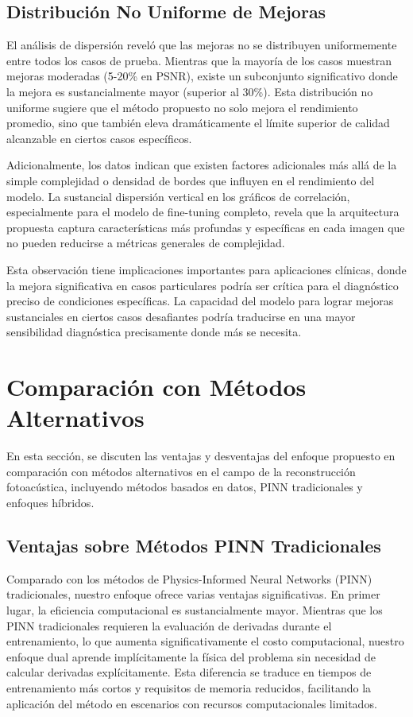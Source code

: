 \subsection{Distribución No Uniforme de Mejoras}

El análisis de dispersión reveló que las mejoras no se distribuyen uniformemente entre todos los casos de prueba. Mientras que la mayoría de los casos muestran mejoras moderadas (5-20\% en PSNR), existe un subconjunto significativo donde la mejora es sustancialmente mayor (superior al 30\%). Esta distribución no uniforme sugiere que el método propuesto no solo mejora el rendimiento promedio, sino que también eleva dramáticamente el límite superior de calidad alcanzable en ciertos casos específicos.

Adicionalmente, los datos indican que existen factores adicionales más allá de la simple complejidad o densidad de bordes que influyen en el rendimiento del modelo. La sustancial dispersión vertical en los gráficos de correlación, especialmente para el modelo de fine-tuning completo, revela que la arquitectura propuesta captura características más profundas y específicas en cada imagen que no pueden reducirse a métricas generales de complejidad.

Esta observación tiene implicaciones importantes para aplicaciones clínicas, donde la mejora significativa en casos particulares podría ser crítica para el diagnóstico preciso de condiciones específicas. La capacidad del modelo para lograr mejoras sustanciales en ciertos casos desafiantes podría traducirse en una mayor sensibilidad diagnóstica precisamente donde más se necesita.

\section{Comparación con Métodos Alternativos}

En esta sección, se discuten las ventajas y desventajas del enfoque propuesto en comparación con métodos alternativos en el campo de la reconstrucción fotoacústica, incluyendo métodos basados en datos, PINN tradicionales y enfoques híbridos.

\subsection{Ventajas sobre Métodos PINN Tradicionales}

Comparado con los métodos de Physics-Informed Neural Networks (PINN) tradicionales, nuestro enfoque ofrece varias ventajas significativas. En primer lugar, la eficiencia computacional es sustancialmente mayor. Mientras que los PINN tradicionales requieren la evaluación de derivadas durante el entrenamiento, lo que aumenta significativamente el costo computacional, nuestro enfoque dual aprende implícitamente la física del problema sin necesidad de calcular derivadas explícitamente. Esta diferencia se traduce en tiempos de entrenamiento más cortos y requisitos de memoria reducidos, facilitando la aplicación del método en escenarios con recursos computacionales limitados.

